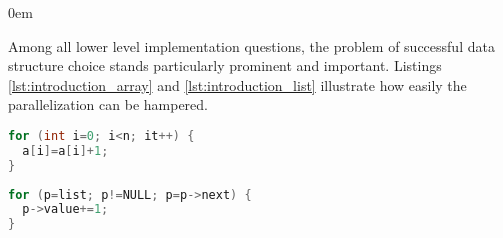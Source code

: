 \begin{description}[style=unboxed,leftmargin=0cm]
\itemsep0em
\item[\textit{Data-centric parallelization (DCP) problem}] Among all lower level implementation questions, the problem of successful data structure choice stands particularly prominent and important. Listings \ref{lst:introduction_array} and \ref{lst:introduction_list} illustrate how easily the parallelization can be hampered.\newline\null
\begin{minipage}[t]{0.45\linewidth}
\begin{lstlisting}[caption={Parallelizable loop operating on a \textbf{linear array}.},label={lst:introduction_array},language=C]
for (int i=0; i<n; it++) {
  a[i]=a[i]+1;
}
\end{lstlisting}
\end{minipage}
%
\begin{minipage}[t]{0.5\linewidth}
\begin{lstlisting}[caption={Non-parallelizable loop operating on a \textbf{linked-list}.},label={lst:introduction_list},language=C]
for (p=list; p!=NULL; p=p->next) {
  p->value+=1;
}
\end{lstlisting}
\end{minipage}


\end{description}

